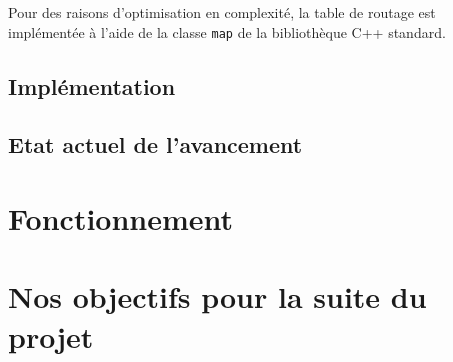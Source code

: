 \documentclass[a4paper,11pt]{article}
\begin{document}
Pour des raisons d'optimisation en complexité, la table de routage est implémentée à l'aide de la classe \texttt{map} de la bibliothèque C++ standard.

\subsection{Implémentation}

\subsection{Etat actuel de l'avancement}

\section{Fonctionnement}


\section{Nos objectifs pour la suite du projet}

\begin{gantt}{10}{9}
  \begin{ganttitle}
  \end{ganttitle}

\end{gantt}
\end{document}
